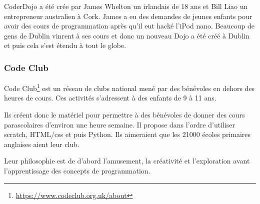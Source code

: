 CoderDojo a été crée par James Whelton un irlandais de 18 ans et Bill Liao un entrepreneur australien à Cork. James a eu des demandes de jeunes enfants pour avoir des cours de programmation après qu'il eut hacké l'iPod nano. Beaucoup de gens de Dublin vinrent à ses cours et donc un nouveau Dojo a été créé à Dublin et puis cela s'est étendu à tout le globe.

\subsubsection{Code Club}

Code Club\footnote{\url{https://www.codeclub.org.uk/about}} est un réseau de clubs national mené par des bénévoles en dehors des heures de cours. Ces activités s'adressent à des enfants de 9 à 11 ans.

Ils créent donc le matériel pour permettre à des bénévoles de donner des cours parascolaires d'environ une heure semaine. Il propose dans l'ordre d'utiliser scratch, HTML/css et puis Python. Ils aimeraient que les 21000 écoles primaires anglaises aient leur club.

Leur philosophie est de d'abord l'amusement, la créativité et l'exploration avant l'apprentissage des concepts de programmation.
